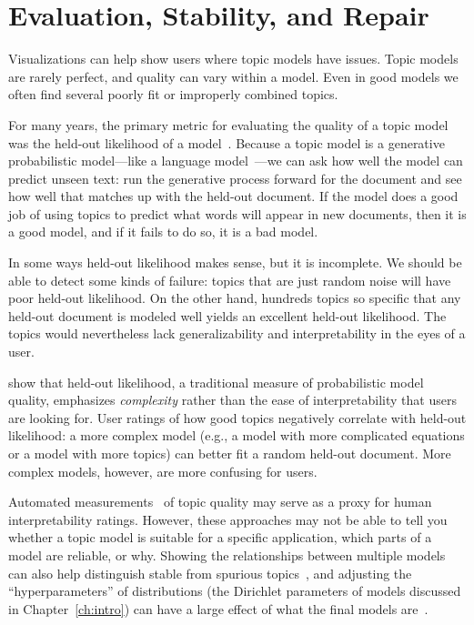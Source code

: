 \section{Evaluation, Stability, and Repair}
\label{sec:coherence}

Visualizations can help show users where topic models have issues.
Topic models are rarely perfect, and quality can vary within a
model. Even in good models we often find several poorly fit or
improperly combined topics. 

For many years, the primary metric for evaluating the quality of a
topic model was the held-out likelihood of a model~\citep{wallach-09a}.
Because a topic model is a generative probabilistic model---like a
language model~\citep{chen-98}---we can ask how well the model can
predict unseen text: run the generative process forward for the
document and see how well that matches up with the held-out document.
If the model does a good job of using topics to predict what words
will appear in new documents, then it is a good model, and if it fails
to do so, it is a bad model.

In some ways held-out likelihood makes sense, but it is incomplete.
We should be able to detect some kinds of failure: topics that are just random noise will have poor held-out likelihood.
On the other hand, hundreds topics so specific that any held-out
document is modeled well yields an excellent held-out likelihood.
The topics would nevertheless lack generalizability and
interpretability in the eyes of a user.

\citet{chang-09b} show that
held-out likelihood, a traditional measure of probabilistic model quality,
emphasizes \emph{complexity} rather than the ease of interpretability
that users are looking for.  
User ratings of how good topics negatively correlate with
held-out likelihood: a more complex model (e.g., a model with more
complicated equations or a model with more topics) can better fit a random
held-out document. 
More complex models, however, are more confusing for users. 

Automated measurements~\citep{newman-10,mimno-11,lau-14} of topic
quality may serve as a proxy for human interpretability ratings.
However, these approaches may not be able to tell you
whether a topic model is suitable for a specific application, which parts of a model are reliable, or why.
Showing the relationships between multiple models can also help
distinguish stable from spurious topics~\citep{chuang-15}, and
adjusting the ``hyperparameters'' of distributions (the Dirichlet
parameters of models discussed in Chapter~\ref{ch:intro}) can have a
large effect of what the final models are~\citep{wallach-09b}.

